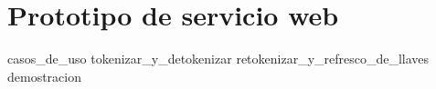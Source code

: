 %
%
%

\section{Prototipo de servicio web}

{casos_de_uso}
{tokenizar_y_detokenizar}
{retokenizar_y_refresco_de_llaves}
{demostracion}

